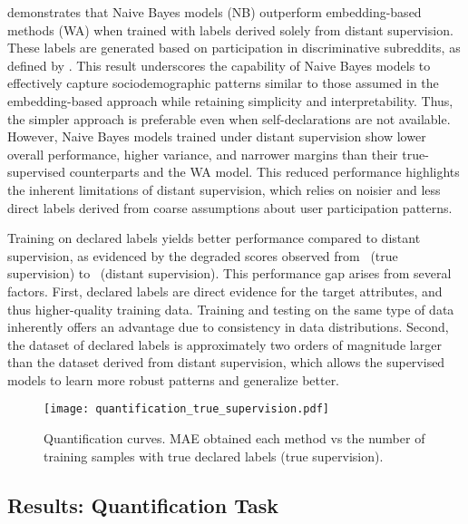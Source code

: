  demonstrates that Naive Bayes models (NB) outperform embedding-based methods (WA) when trained with labels derived solely from distant supervision.
These labels are generated based on participation in discriminative subreddits, as defined by \citet{waller2021quantifying}.
This result underscores the capability of Naive Bayes models to effectively capture sociodemographic patterns similar to those assumed in the embedding-based approach while retaining simplicity and interpretability.
Thus, the simpler approach is preferable even when self-declarations are not available.
However, Naive Bayes models trained under distant supervision show lower overall performance, higher variance, and narrower margins than their true-supervised counterparts and the WA model.
This reduced performance highlights the inherent limitations of distant supervision, which relies on noisier and less direct labels derived from coarse assumptions about user participation patterns.

Training on declared labels yields better performance compared to distant supervision, as evidenced by the degraded scores observed from~ (true supervision) to~ (distant supervision).
This performance gap arises from several factors.
First, declared labels are direct evidence for the target attributes, and thus higher-quality training data.
Training and testing on the same type of data inherently offers an advantage due to consistency in data distributions.
Second, the dataset of declared labels is approximately two orders of magnitude larger than the dataset derived from distant supervision, which allows the supervised models to learn more robust patterns and generalize better.


\begin{figure*}[ht!]
\centering
\texttt{[image: quantification\_true\_supervision.pdf]}
\caption{Quantification curves. MAE obtained each method vs the number of training samples with true declared labels (true supervision).}
\label{fig:curves}
\end{figure*}


\subsection{Results: Quantification Task}

